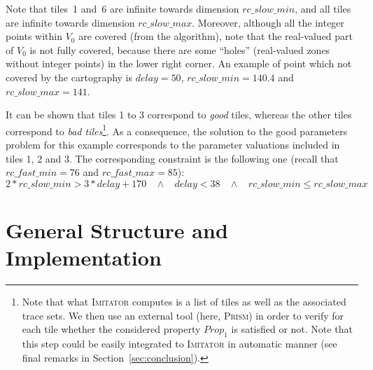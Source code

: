 \documentclass[a4paper,10pt]{article}
\newcommand{\rcpFMax}{\mathit{rc\_fast\_max}}
\newcommand{\rcpFMin}{\mathit{rc\_fast\_min}}
\newcommand{\rcpSMax}{\mathit{rc\_slow\_max}}
\newcommand{\rcpSMin}{\mathit{rc\_slow\_min}}
\newcommand{\rcpD}{\mathit{delay}}
\newcommand{\imitator}{\textsc{Imitator}}
\newcommand{\prism}{\textsc{Prism}}
\begin{document}
Note that tiles~1 and~6 are infinite towards dimension $\rcpSMin$, and all tiles are infinite towards dimension $\rcpSMax$.
Moreover, although all the integer points within $V_0$ are covered (from the algorithm), note that the real-valued part of $V_0$ is not fully covered, because there are some ``holes'' (real-valued zones without integer points) in the lower right corner.
An example of point which not covered by the cartography is $\rcpD = 50$, $\rcpSMin = 140.4$ and $\rcpSMax = 141$.

It can be shown that tiles 1 to 3 correspond to \emph{good} tiles, whereas the other tiles correspond to \emph{bad tiles}\footnote{Note that what \imitator{} computes is a list of tiles as well as the associated trace sets.
We then use an external tool (here, \prism{}) in order to verify for each tile whether the considered property $\mathit{Prop}_1$ is satisfied or not.
Note that this step could be easily integrated to \imitator{} in automatic manner (see final remarks in Section~\ref{sec:conclusion}).}.
As a consequence, the solution to the good parameters problem for this example corresponds to the parameter valuations included in tiles 1, 2 and 3.
The corresponding constraint is the following one (recall that $\rcpFMin = 76$ and $\rcpFMax = 85$):
$$ 2 * \rcpSMin > 3 * \rcpD + 170 \ \ \ \ \land \ \ \ \ \rcpD < 38 \ \ \ \ \land \ \ \ \ \rcpSMin \leq \rcpSMax$$









\section[Implementation]{General Structure and Implementation} \label{sec:implementation}
\end{document}
